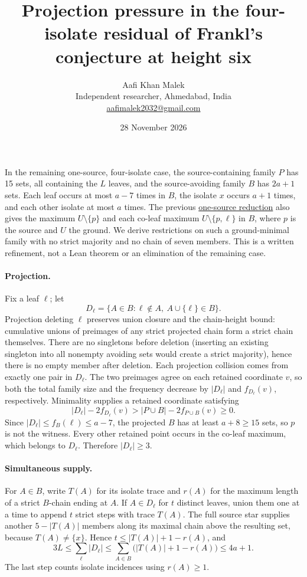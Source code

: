 \documentclass[11pt,letterpaper]{article}
\title{Projection pressure in the four-isolate residual of Frankl's conjecture at height six}
\author{Aafi Khan Malek\\ \small Independent researcher, Ahmedabad, India\\
\small\href{mailto:aafimalek2032@gmail.com}{aafimalek2032@gmail.com}}
\date{28 November 2026}
\begin{document}
\maketitle
In the remaining one-source, four-isolate case, the source-containing
family \(P\) has 15 sets, all containing the \(L\) leaves, and the
source-avoiding family \(B\) has \(2a+1\) sets. Each leaf occurs
at most \(a-7\) times in \(B\), the isolate \(x\) occurs \(a+1\)
times, and each other isolate at most \(a\) times. The previous
\href{https://github.com/Aafimalek/novel-discoveries/tree/ee26cffa039ab70483769985615a0738f7dbfb2d/frankl-height-six/verification/four-isolate-trace-enlargement}{one-source reduction}
also gives the maximum \(U\setminus\{p\}\) and each co-leaf
maximum \(U\setminus\{p,\ell\}\) in \(B\), where \(p\) is the
source and \(U\) the ground. We derive restrictions on such a
ground-minimal family with no strict majority and no chain of seven
members. This is a written refinement, not a Lean theorem or an
elimination of the remaining case.

\paragraph{Projection.}
Fix a leaf \(\ell\); let
\[
 D_\ell=\{A\in B:\ell\notin A,\ A\cup\{\ell\}\in B\}.
\]
Projection deleting \(\ell\) preserves union closure and the
chain-height bound: cumulative unions of preimages of any strict
projected chain form a strict chain themselves. There are no
singletons before deletion (inserting an existing singleton into
all nonempty avoiding sets would create a strict majority), hence
there is no empty member after deletion. Each projection collision
comes from exactly one pair in \(D_\ell\). The two preimages
agree on each retained coordinate \(v\), so both the total family
size and the frequency decrease by \(|D_\ell|\) and \(f_{D_\ell}(v)\),
respectively. Minimality supplies a retained coordinate satisfying
\begin{equation}\label{eq:pressure}
 |D_\ell|-2f_{D_\ell}(v)>|P\cup B|-2f_{P\cup B}(v)\ge0.
\end{equation}
Since \(|D_\ell|\le f_B(\ell)\le a-7\), the projected \(B\)
has at least \(a+8\ge15\) sets, so \(p\) is not the witness.
Every other retained point occurs in the co-leaf maximum,
which belongs to \(D_\ell\). Therefore \(|D_\ell|\ge3\).

\newpage
\paragraph{Simultaneous supply.}
For \(A\in B\), write \(T(A)\) for its isolate trace and \(r(A)\)
for the maximum length of a strict \(B\)-chain ending at \(A\).
If \(A\in D_\ell\) for \(t\) distinct leaves, union them one
at a time to append \(t\) strict steps with trace \(T(A)\).
The full source star supplies another \(5-|T(A)|\) members
along its maximal chain above the resulting set, because
\(T(A)\ne\{x\}\). Hence \(t\le |T(A)|+1-r(A)\), and
\[
 3L\le\sum_\ell |D_\ell|
 \le\sum_{A\in B}\bigl(|T(A)|+1-r(A)\bigr)\le4a+1 .
\]
The last step counts isolate incidences using \(r(A)\ge1\).
\end{document}
